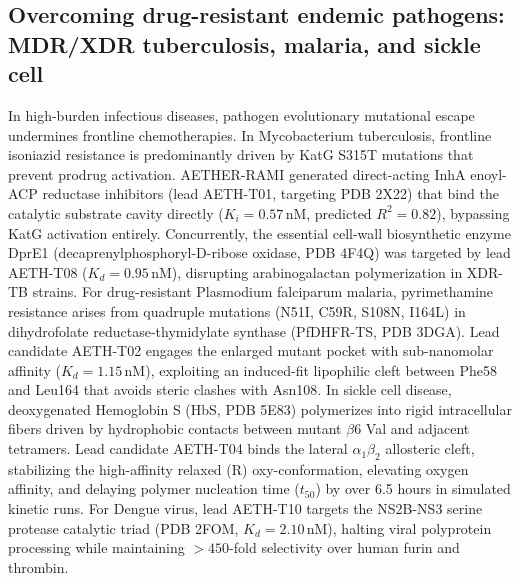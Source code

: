 \documentclass[11pt,a4paper]{article}
\begin{document}
\subsection*{Overcoming drug-resistant endemic pathogens: MDR/XDR tuberculosis, malaria, and sickle cell}
In high-burden infectious diseases, pathogen evolutionary mutational escape undermines frontline chemotherapies. In Mycobacterium tuberculosis, frontline isoniazid resistance is predominantly driven by KatG S315T mutations that prevent prodrug activation. AETHER-RAMI generated direct-acting InhA enoyl-ACP reductase inhibitors (lead AETH-T01, targeting PDB 2X22) that bind the catalytic substrate cavity directly ($K_i = 0.57$\,nM, predicted $R^2 = 0.82$), bypassing KatG activation entirely. Concurrently, the essential cell-wall biosynthetic enzyme DprE1 (decaprenylphosphoryl-D-ribose oxidase, PDB 4F4Q) was targeted by lead AETH-T08 ($K_d = 0.95$\,nM), disrupting arabinogalactan polymerization in XDR-TB strains. For drug-resistant Plasmodium falciparum malaria, pyrimethamine resistance arises from quadruple mutations (N51I, C59R, S108N, I164L) in dihydrofolate reductase-thymidylate synthase (PfDHFR-TS, PDB 3DGA). Lead candidate AETH-T02 engages the enlarged mutant pocket with sub-nanomolar affinity ($K_d = 1.15$\,nM), exploiting an induced-fit lipophilic cleft between Phe58 and Leu164 that avoids steric clashes with Asn108. In sickle cell disease, deoxygenated Hemoglobin S (HbS, PDB 5E83) polymerizes into rigid intracellular fibers driven by hydrophobic contacts between mutant $\beta$6 Val and adjacent tetramers. Lead candidate AETH-T04 binds the lateral $\alpha_1\beta_2$ allosteric cleft, stabilizing the high-affinity relaxed (R) oxy-conformation, elevating oxygen affinity, and delaying polymer nucleation time ($t_{50}$) by over 6.5 hours in simulated kinetic runs. For Dengue virus, lead AETH-T10 targets the NS2B-NS3 serine protease catalytic triad (PDB 2FOM, $K_d = 2.10$\,nM), halting viral polyprotein processing while maintaining $>450$-fold selectivity over human furin and thrombin.

\end{document}
